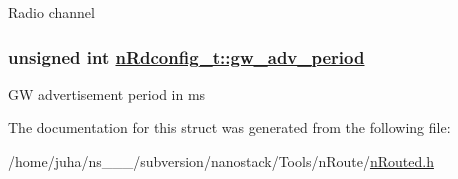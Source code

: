 Radio channel \hypertarget{structnRdconfig__t_cd53e23e512aeb2e8ad49df6ed9dfd5d}{
\subsubsection[gw\_\-adv\_\-period]{\setlength{\rightskip}{0pt plus 5cm}unsigned int \hyperlink{structnRdconfig__t_cd53e23e512aeb2e8ad49df6ed9dfd5d}{n\-Rdconfig\_\-t::gw\_\-adv\_\-period}}}
\label{structnRdconfig__t_cd53e23e512aeb2e8ad49df6ed9dfd5d}


GW advertisement period in ms 

The documentation for this struct was generated from the following file:\begin{CompactItemize}
\item 
/home/juha/ns\_\_\_/subversion/nanostack/Tools/n\-Route/\hyperlink{nRouted_8h}{n\-Routed.h}\end{CompactItemize}
